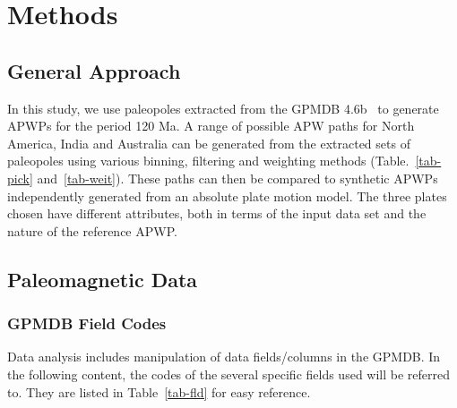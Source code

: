 \section{Methods}

\subsection{General Approach}

In this study, we use paleopoles extracted from the GPMDB 4.6b~\citep{M96,P05}
to generate APWPs for the period 120 Ma. A range of possible APW
paths for North America, India and Australia can be generated from the extracted
sets of paleopoles using various binning, filtering and weighting methods
(Table.~\ref{tab-pick} and~\ref{tab-weit}). These paths can then be compared to
synthetic APWPs independently generated from an absolute plate motion model. The
three plates chosen have different attributes, both in terms of the input data
set and the nature of the reference APWP\@.

\subsection{Paleomagnetic Data}

\subsubsection{GPMDB Field Codes}

Data analysis includes manipulation of data fields/columns in the GPMDB\@. In
the following content, the codes of the several specific fields used will be
referred to. They are listed in Table~\ref{tab-fld} for easy reference.

